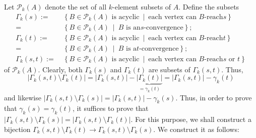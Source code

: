 \documentclass[numbers=enddot,12pt,final,onecolumn,notitlepage]{scrartcl}%
\theoremstyle{definition}
\theoremstyle{plainsl}
\begin{document}
Let $\mathcal{P}_{k}\left(  A\right)  $ denote the set of all $k$-element
subsets of $A$. Define the subsets
\begin{align*}
\Gamma_{k}\left(  s\right)  :=  &  \ \left\{  B\in\mathcal{P}_{k}\left(
A\right)  \text{ is acyclic}\ \mid\ \text{each vertex can }B\text{-reach
}s\right\} \\
=  &  \ \left\{  B\in\mathcal{P}_{k}\left(  A\right)  \ \mid\ B\text{ is an
}s\text{-convergence}\right\}  ;\\
\Gamma_{k}\left(  t\right)  :=  &  \ \left\{  B\in\mathcal{P}_{k}\left(
A\right)  \text{ is acyclic}\ \mid\ \text{each vertex can }B\text{-reach
}t\right\} \\
=  &  \ \left\{  B\in\mathcal{P}_{k}\left(  A\right)  \ \mid\ B\text{ is a
}t\text{-convergence}\right\}  ;\\
\Gamma_{k}\left(  s,t\right)  :=  &  \ \left\{  B\in\mathcal{P}_{k}\left(
A\right)  \text{ is acyclic}\ \mid\ \text{each vertex can }B\text{-reach
}s\text{ or }t\right\}
\end{align*}
of $\mathcal{P}_{k}\left(  A\right)  $. Clearly, both $\Gamma_{k}\left(
s\right)  $ and $\Gamma_{k}\left(  t\right)  $ are subsets of $\Gamma
_{k}\left(  s,t\right)  $. Thus,
\[
\left\vert \Gamma_{k}\left(  s,t\right)  \setminus\Gamma_{k}\left(  t\right)
\right\vert =\left\vert \Gamma_{k}\left(  s,t\right)  \right\vert
-\underbrace{\left\vert \Gamma_{k}\left(  t\right)  \right\vert }_{=\gamma
_{k}\left(  t\right)  }=\left\vert \Gamma_{k}\left(  s,t\right)  \right\vert
-\gamma_{k}\left(  t\right)
\]
and likewise $\left\vert \Gamma_{k}\left(  s,t\right)  \setminus\Gamma
_{k}\left(  s\right)  \right\vert =\left\vert \Gamma_{k}\left(  s,t\right)
\right\vert -\gamma_{k}\left(  s\right)  $. Thus, in order to prove that
$\gamma_{k}\left(  s\right)  =\gamma_{k}\left(  t\right)  $, it suffices to
prove that $\left\vert \Gamma_{k}\left(  s,t\right)  \setminus\Gamma
_{k}\left(  s\right)  \right\vert =\left\vert \Gamma_{k}\left(  s,t\right)
\setminus\Gamma_{k}\left(  t\right)  \right\vert $. For this purpose, we shall
construct a bijection $\Gamma_{k}\left(  s,t\right)  \setminus\Gamma
_{k}\left(  t\right)  \rightarrow\Gamma_{k}\left(  s,t\right)  \setminus
\Gamma_{k}\left(  s\right)  $. We construct it as follows:
\end{document}
